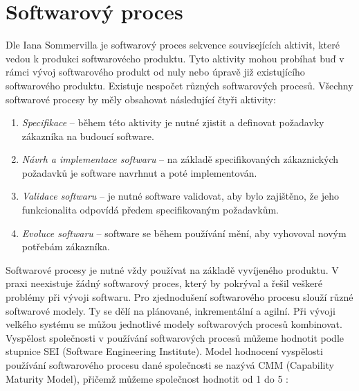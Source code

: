 \documentclass[czech,master,public,dept460,male,cpdeclaration,oneside]{diploma}
\begin{document}
\section{Softwarový proces}
\label{sec:sw_process}

Dle Iana Sommervilla \cite{ref:sommerrville_sw_process} je softwarový proces sekvence souvisejících aktivit, které vedou k produkci softwarovécho produktu. Tyto aktivity mohou probíhat buď v rámci vývoj softwarového produkt od nuly nebo úpravě již existujícího softwarového produktu. Existuje nespočet různých softwarových procesů. Všechny softwarové procesy by měly obsahovat následující čtyři aktivity:

\begin{enumerate}
\item \textit{Specifikace} -- během této aktivity je nutné zjistit a definovat požadavky zákazníka na budoucí software.
\item \textit{Návrh a implementace softwaru} -- na základě specifikovaných zákaznických požadavků je software navrhnut a poté implementován.
\item \textit{Validace softwaru }-- je nutné software validovat, aby bylo zajištěno, že jeho funkcionalita odpovídá předem specifikovaným požadavkům.
\item \textit{Evoluce softwaru} -- software se během používání mění, aby vyhovoval novým potřebám zákazníka.
\end{enumerate}

Softwarové procesy je nutné vždy používat na základě vyvíjeného produktu. V praxi neexistuje žádný softwarový proces, který by pokrýval a řešil veškeré problémy při vývoji softwaru. Pro zjednodušení softwarového procesu slouží různé softwarové modely. Ty se dělí na plánované, inkrementální a agilní. Při vývoji velkého systému se můžou jednotlivé modely softwarových procesů kombinovat. Vyspělost společnosti v používání softwarových procesů můžeme hodnotit podle stupnice SEI (Software
Engineering Institute). Model hodnocení vyspělosti používání softwarového procesu dané společnosti se nazývá CMM (Capability Maturity Model), přičemž můžeme společnost hodnotit od 1 do 5 \cite{ref:sw_process_vondrak}:
\end{document}
